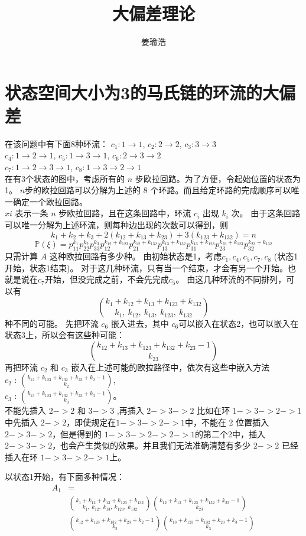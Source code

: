 \documentclass[cn,hazy,egreen,14pt,normal]{elegantnote}
\title{大偏差理论}
\author{姜瑜浩}
\date{\zhtoday}
\begin{document}
\section*{状态空间大小为3的马氏链的环流的大偏差}
在该问题中有下面8种环流：
$c_1: 1 \rightarrow 1$, $c_2: 2 \rightarrow 2$, $c_3: 3 \rightarrow 3$ \\
$c_4: 1 \rightarrow 2 \rightarrow 1$, $c_5: 1 \rightarrow 3 \rightarrow 1$, $c_6: 2 \rightarrow 3 \rightarrow 2$ \\
$c_7: 1 \rightarrow 2 \rightarrow 3 \rightarrow 1$, $c_8: 1 \rightarrow 3 \rightarrow 2 \rightarrow 1$\\
在有3个状态的图中，考虑所有的 $n$ 步欧拉回路。为了方便，令起始位置的状态为1。 $n$步的欧拉回路可以分解为上述的 8 个环路。而且给定环路的完成顺序可以唯一确定一个欧拉回路。\\
$xi$ 表示一条 $n$ 步欧拉回路，且在这条回路中，环流 $c_i$ 出现 $k_i$ 次。
由于这条回路可以唯一分解为上述环流，则每种边出现的次数可以得到，则
$$
k_1 + k_2 + k_3 + 2(k_{12} + k_{13} +k_{23}) + 3(k_{123} + k_{132}) = n 
$$
$$
\mathbb{P}(\xi) = p_{11}^{k_1} p_{22}^{k_2} p_{33}^{k_3} p_{12}^{k_{12}+k_{123}} p_{21}^{k_{12}+k_{132}} p_{13}^{k_{13}+k_{132}} p_{31}^{k_{13}+k_{123}} p_{23}^{k_{23}+k_{123}} p_{32}^{k_{23}+k_{132}} 
$$
只需计算 $A$ 这种欧拉回路有多少种。
由初始状态是1，考虑$c_1, c_4, c_5, c_7, c_8$ (状态1开始，状态1结束)。
对于这几种环流，只有当一个结束，才会有另一个开始。也就是说在$c_7$开始，但没完成之前，不会先完成$c_5$。
由这几种环流的不同排列，可以有
$$
\binom{k_1 + k_{12} + k_{13} + k_{123} +k_{132}}{k_1, ~k_{12}, ~k_{13}, ~k_{123}, ~k_{132}} 
$$
种不同的可能。
先把环流 $c_6$ 嵌入进去，其中 $c_6$可以嵌入在状态2，也可以嵌入在状态3上，所以会有这些种可能：
$$
\binom{k_{12} +k_{13} + k_{123} +k_{132} + k_{23} - 1}{k_{23}}
$$
再把环流 $c_2$ 和 $c_3$ 嵌入在上述可能的欧拉路径中，依次有这些中嵌入方法 \\
$c_2$ : $\binom{k_{12} + k_{123} + k_{132} +k_{23} +k_2 -1}{k_2}$, \\
$c_3$ : $\binom{k_{13} +k_{123} +k_{132} +k_{23} +k_3 -1}{k_3}$。\\

不能先插入 $2->2$ 和 $3->3$ ,再插入 $2->3->2$
比如在环 $1->3->2->1$ 中先插入 $2->2$，即使规定在$1->3->2->1$中，不能在 2 位置插入 $2->3->2$，但是得到的 $1->3->2->2->1$的第二个2中，插入 $2->3->2$，也会产生类似的效果。并且我们无法准确清楚有多少 $2->2$ 已经插入在环 $1->3->2->1$上。


以状态1开始，有下面多种情况：
\begin{align*}
    A_1 &= \\ 
    &\binom{k_1 + k_{12} + k_{13} + k_{123} +k_{132}}{k_1, ~k_{12}, ~k_{13}, ~k_{123}, ~k_{132}} 
    \binom{k_{12} +k_{13} + k_{123} +k_{132} + k_{23} - 1}{k_{23}} \\
    &\binom{k_{12} + k_{123} + k_{132} +k_{23} +k_2 -1}{k_2} \binom{k_{13} +k_{123} +k_{132} +k_{23} +k_3 -1}{k_3}
\end{align*}
\end{document}
